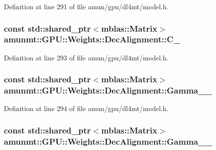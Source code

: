 Definition at line 291 of file amun/gpu/dl4mt/model.\+h.

\subsubsection[{\texorpdfstring{C\+\_\+}{C_}}]{\setlength{\rightskip}{0pt plus 5cm}const std\+::shared\+\_\+ptr$<${\bf mblas\+::\+Matrix}$>$ amunmt\+::\+G\+P\+U\+::\+Weights\+::\+Dec\+Alignment\+::\+C\+\_\+}\hypertarget{structamunmt_1_1GPU_1_1Weights_1_1DecAlignment_a3952c253436d75dc9e4ffedc1084eae9}{}\label{structamunmt_1_1GPU_1_1Weights_1_1DecAlignment_a3952c253436d75dc9e4ffedc1084eae9}


Definition at line 293 of file amun/gpu/dl4mt/model.\+h.

\subsubsection[{\texorpdfstring{Gamma\+\_\+1\+\_\+}{Gamma_1_}}]{\setlength{\rightskip}{0pt plus 5cm}const std\+::shared\+\_\+ptr$<${\bf mblas\+::\+Matrix}$>$ amunmt\+::\+G\+P\+U\+::\+Weights\+::\+Dec\+Alignment\+::\+Gamma\+\_\+\_\+}\hypertarget{structamunmt_1_1GPU_1_1Weights_1_1DecAlignment_ad3ae4a95e58488e0ec98a85c0d119d5f}{}\label{structamunmt_1_1GPU_1_1Weights_1_1DecAlignment_ad3ae4a95e58488e0ec98a85c0d119d5f}


Definition at line 294 of file amun/gpu/dl4mt/model.\+h.

\subsubsection[{\texorpdfstring{Gamma\+\_\+2\+\_\+}{Gamma_2_}}]{\setlength{\rightskip}{0pt plus 5cm}const std\+::shared\+\_\+ptr$<${\bf mblas\+::\+Matrix}$>$ amunmt\+::\+G\+P\+U\+::\+Weights\+::\+Dec\+Alignment\+::\+Gamma\+\_\+\_\+}\hypertarget{structamunmt_1_1GPU_1_1Weights_1_1DecAlignment_abdca6855824dfda07fe9c2d49c1e9a5e}{}\label{structamunmt_1_1GPU_1_1Weights_1_1DecAlignment_abdca6855824dfda07fe9c2d49c1e9a5e}


